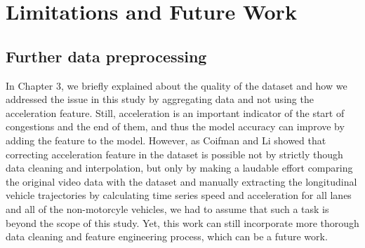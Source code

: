 \documentclass[11pt]{uonthesis}
\begin{document}
\chapter{Limitations and Future Work}

\section{Further data preprocessing}

In Chapter 3, we briefly explained about the quality of the dataset and how we addressed the issue in this study by aggregating data and not using the acceleration feature. Still, acceleration is an important indicator of the start of congestions and the end of them, and thus the model accuracy can improve by adding the feature to the model. However, as Coifman and Li\cite{COIFMAN2017362} showed that correcting acceleration feature in the dataset is possible not by strictly though data cleaning and interpolation, but only by making a laudable effort comparing the original video data with the dataset and manually extracting the longitudinal vehicle trajectories by calculating time series speed and acceleration for all lanes and all of the non-motorcyle vehicles, we had to assume that such a task is beyond the scope of this study. Yet, this work can still incorporate more thorough data cleaning and feature engineering process, which can be a future work.
\end{document}
